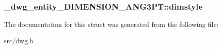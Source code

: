 \hypertarget{struct__dwg__entity__DIMENSION__ANG3PT_a5a4068fe0e555d6f8df4baf60ceab774}{
\subsubsection[{dimstyle}]{ {\bf \-\_\-dwg\-\_\-entity\-\_\-\-D\-I\-M\-E\-N\-S\-I\-O\-N\-\_\-\-A\-N\-G3\-P\-T\-::dimstyle}}}\label{struct__dwg__entity__DIMENSION__ANG3PT_a5a4068fe0e555d6f8df4baf60ceab774}


\-The documentation for this struct was generated from the following file\-:\begin{DoxyCompactItemize}
\item 
src/\hyperlink{dwg_8h}{dwg.\-h}\end{DoxyCompactItemize}
